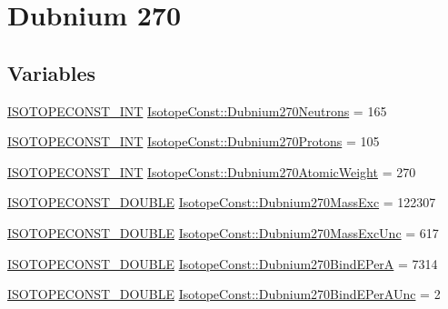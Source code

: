 \hypertarget{group___isotope_const-_dubnium-_db270}{}\section{Dubnium 270}
\label{group___isotope_const-_dubnium-_db270}
\subsection*{Variables}
\begin{DoxyCompactItemize}
\item 
\mbox{\hyperlink{group___isotope_const-_macros_ga5f18360b3e99483a35c32d789e62621c}{I\+S\+O\+T\+O\+P\+E\+C\+O\+N\+S\+T\+\_\+\+I\+NT}} \mbox{\hyperlink{group___isotope_const-_dubnium-_db270_gacf3bfa02f058b3a459cc2c9e994ee283}{Isotope\+Const\+::\+Dubnium270\+Neutrons}} = 165
\item 
\mbox{\hyperlink{group___isotope_const-_macros_ga5f18360b3e99483a35c32d789e62621c}{I\+S\+O\+T\+O\+P\+E\+C\+O\+N\+S\+T\+\_\+\+I\+NT}} \mbox{\hyperlink{group___isotope_const-_dubnium-_db270_ga71f7fcf327c0d559d043d8ff1ab4cb94}{Isotope\+Const\+::\+Dubnium270\+Protons}} = 105
\item 
\mbox{\hyperlink{group___isotope_const-_macros_ga5f18360b3e99483a35c32d789e62621c}{I\+S\+O\+T\+O\+P\+E\+C\+O\+N\+S\+T\+\_\+\+I\+NT}} \mbox{\hyperlink{group___isotope_const-_dubnium-_db270_ga0ad1398e194fd7e8e1b0009911300159}{Isotope\+Const\+::\+Dubnium270\+Atomic\+Weight}} = 270
\item 
\mbox{\hyperlink{group___isotope_const-_macros_ga8f45a7272ce02c0b4c65c44636ed719a}{I\+S\+O\+T\+O\+P\+E\+C\+O\+N\+S\+T\+\_\+\+D\+O\+U\+B\+LE}} \mbox{\hyperlink{group___isotope_const-_dubnium-_db270_gae0d63cac9554bf97ac8a30cd10a96adf}{Isotope\+Const\+::\+Dubnium270\+Mass\+Exc}} = 122307
\item 
\mbox{\hyperlink{group___isotope_const-_macros_ga8f45a7272ce02c0b4c65c44636ed719a}{I\+S\+O\+T\+O\+P\+E\+C\+O\+N\+S\+T\+\_\+\+D\+O\+U\+B\+LE}} \mbox{\hyperlink{group___isotope_const-_dubnium-_db270_ga33030844d8b7a857f79835004a226f11}{Isotope\+Const\+::\+Dubnium270\+Mass\+Exc\+Unc}} = 617
\item 
\mbox{\hyperlink{group___isotope_const-_macros_ga8f45a7272ce02c0b4c65c44636ed719a}{I\+S\+O\+T\+O\+P\+E\+C\+O\+N\+S\+T\+\_\+\+D\+O\+U\+B\+LE}} \mbox{\hyperlink{group___isotope_const-_dubnium-_db270_gab25fee7d3123474f6e6011dc07712f82}{Isotope\+Const\+::\+Dubnium270\+Bind\+E\+PerA}} = 7314
\item 
\mbox{\hyperlink{group___isotope_const-_macros_ga8f45a7272ce02c0b4c65c44636ed719a}{I\+S\+O\+T\+O\+P\+E\+C\+O\+N\+S\+T\+\_\+\+D\+O\+U\+B\+LE}} \mbox{\hyperlink{group___isotope_const-_dubnium-_db270_ga3e932c3f61f36362e51becc8753919e2}{Isotope\+Const\+::\+Dubnium270\+Bind\+E\+Per\+A\+Unc}} = 2

\end{DoxyCompactItemize}
